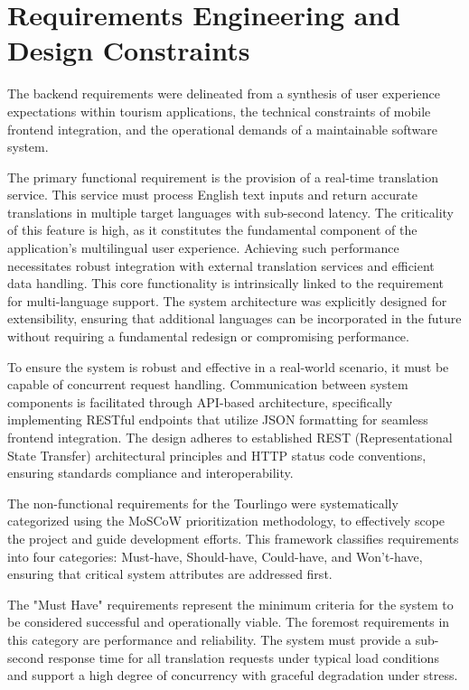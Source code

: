 \section{Requirements Engineering and Design Constraints}

The backend requirements were delineated from a synthesis of user experience expectations within tourism applications, the technical constraints of mobile frontend integration, and the operational demands of a maintainable software system.\cite{requirements-engineering-process}

The primary functional requirement is the provision of a real-time translation service\cite{open-nmt}. This service must process English text inputs and return accurate translations in multiple target languages with sub-second latency. The criticality of this feature is high, as it constitutes the fundamental component of the application's multilingual user experience. Achieving such performance necessitates robust integration with external translation services and efficient data handling. This core functionality is intrinsically linked to the requirement for multi-language support. The system architecture was explicitly designed for extensibility, ensuring that additional languages can be incorporated in the future without requiring a fundamental redesign or compromising performance. 

To ensure the system is robust and effective in a real-world scenario, it must be capable of concurrent request handling. Communication between system components is facilitated through API-based architecture, specifically implementing RESTful endpoints that utilize JSON formatting for seamless frontend integration. The design adheres to established REST (Representational State Transfer) architectural principles and HTTP status code conventions, ensuring standards compliance and interoperability\cite{RESTful,fullstacktips2023restful}.

The non-functional requirements for the Tourlingo were systematically categorized using the MoSCoW prioritization methodology\cite{productplan2019moscow,wikipedia2025moscow}, to effectively scope the project and guide development efforts. This framework classifies requirements into four categories: Must-have, Should-have, Could-have, and Won't-have, ensuring that critical system attributes are addressed first.

The "Must Have"  requirements represent the minimum criteria for the system to be considered successful and operationally viable. The foremost requirements in this category are performance and reliability. The system must provide a sub-second response time for all translation requests under typical load conditions and support a high degree of concurrency with graceful degradation under stress.

